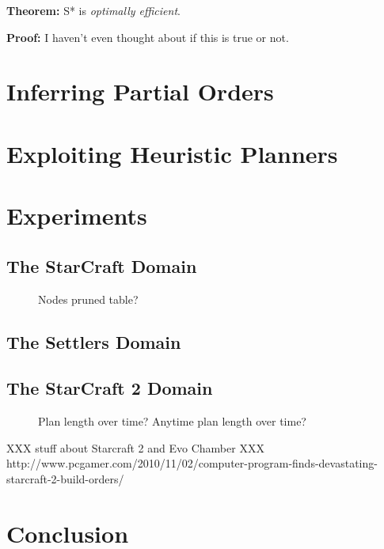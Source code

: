 \documentclass[letterpaper]{article}
\theoremstyle{plain} \newtheorem{theorem}{Theorem} \newtheorem{proposition}{Proposition} \newtheorem{lemma}{Lemma} \newtheorem*{corollary}{Corollary}
\theoremstyle{definition} \newtheorem{definition}{Definition} \newtheorem{conjecture}{Conjecture} \newtheorem*{example}{Example}
\theoremstyle{remark} \newtheorem*{remark}{Remark} \newtheorem*{note}{Note} \newtheorem{case}{Case}
\begin{document}
\textbf{Theorem:} S{*} is \emph{optimally efficient}.

\textbf{Proof:} I haven't even thought about if this is true or not.

\section{Inferring Partial Orders}

\section{Exploiting Heuristic Planners}

\section{Experiments}

\subsection{The StarCraft Domain}
\begin{figure}
  \caption{Nodes pruned table?}
\end{figure}
\subsection{The Settlers Domain}
\subsection{The StarCraft 2 Domain}
\begin{figure}
  \caption{Plan length over time? Anytime plan length over time?}
\end{figure}

XXX stuff about Starcraft 2 and Evo Chamber
XXX http://www.pcgamer.com/2010/11/02/computer-program-finds-devastating-starcraft-2-build-orders/

\section{Conclusion}
\end{document}

